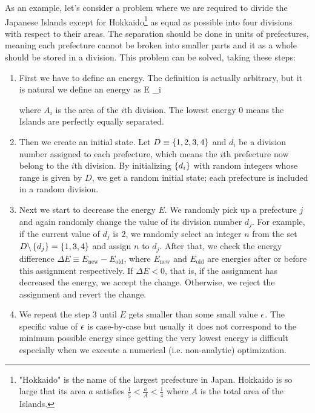\documentclass{article}
\theoremstyle{definition}
\begin{document}
As an example, let's consider a problem where we are required to divide the Japanese Islands except for Hokkaido\footnote{"Hokkaido" is the name of the largest prefecture in Japan. Hokkaido is so large that its area $a$ satisfies $\frac{1}{5} < \frac{a}{A} < \frac{1}{4}$ where $A$ is the total area of the Islands.} as equal as possible into four divisions with respect to their areas. The separation should be done in units of prefectures, meaning each prefecture cannot be broken into smaller parts and it as a whole should be stored in a division. This problem can be solved, taking these steps:
\begin{enumerate}

\item
First we have to define an energy. The definition is actually arbitrary, but it is natural we define an energy as
\begineq
E \equiv \sum _i  
\edeq

where $A_i$ is the area of the $i$th division. The lowest energy $0$ means the Islands are perfectly equally separated.

\item
Then we create an initial state. Let $D \equiv \left\{ 1, 2, 3, 4 \right\}$ and $d_i$ be a division number assigned to each prefecture, which means the $i$th prefecture now belong to the $i$th division. By initializing $\left\{ d_i \right\}$ with random integers whose range is given by $D$, we get a random initial state; each prefecture is included in a random division.

\item
Next we start to decrease the energy $E$. We randomly pick up a prefecture $j$ and again randomly change the value of its division number $d_j$. For example, if the current value of $d_j$ is $2$, we randomly select an integer $n$ from the set $D \backslash \left\{ d_j \right\} = \left\{ 1, 3, 4 \right\}$ and assign $n$ to $d_j$. After that, we check the energy difference $\Delta E \equiv E_\text{new} - E_\text{old}$, where $E_\text{new}$ and $E_\text{old}$ are energies after or before this assignment respectively. If $\Delta E < 0$, that is, if the assignment has decreased the energy, we accept the change. Otherwise, we reject the assignment and revert the change.

\item
We repeat the step 3 until $E$ gets smaller than some small value $\epsilon$. The specific value of $\epsilon$ is case-by-case but usually it does not correspond to the minimum possible energy since getting the very lowest energy is difficult especially when we execute a numerical (i.e. non-analytic) optimization.

\end{enumerate}
\end{document}
